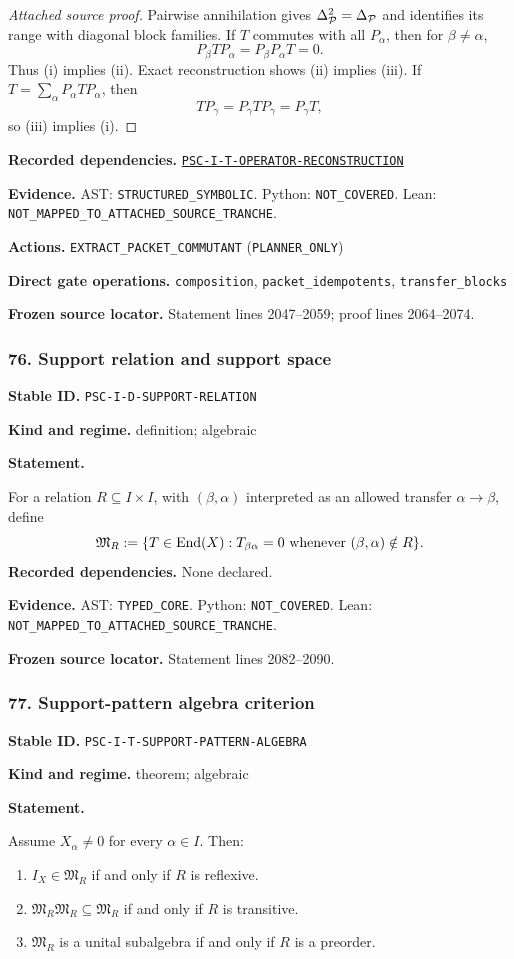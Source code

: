 \documentclass[a4paper,11pt]{article}
\newcommand{\field}[2]{\noindent\textbf{#1.} #2\par}
\begin{document}
\begin{proof}[Attached source proof]
Pairwise annihilation gives $\Delta_{\mathcal P}^2=\Delta_{\mathcal P}$ and identifies its range with diagonal block families.  If $T$ commutes with all $P_\alpha$, then for $\beta\neq\alpha$,
\[
P_\beta TP_\alpha=P_\beta P_\alpha T=0.
\]
Thus (i) implies (ii).  Exact reconstruction shows (ii) implies (iii).  If $T=\sum_\alpha P_\alpha TP_\alpha$, then
\[
TP_\gamma=P_\gamma TP_\gamma=P_\gamma T,
\]
so (iii) implies (i).
\end{proof}
\field{Recorded dependencies}{\hyperref[rec:PSC-I-T-OPERATOR-RECONSTRUCTION]{\nolinkurl{PSC-I-T-OPERATOR-RECONSTRUCTION}}}
\field{Evidence}{AST: \nolinkurl{STRUCTURED_SYMBOLIC}. Python: \nolinkurl{NOT_COVERED}. Lean: \nolinkurl{NOT_MAPPED_TO_ATTACHED_SOURCE_TRANCHE}.}
\field{Actions}{\nolinkurl{EXTRACT_PACKET_COMMUTANT} (\nolinkurl{PLANNER_ONLY})}
\field{Direct gate operations}{\nolinkurl{composition}, \nolinkurl{packet_idempotents}, \nolinkurl{transfer_blocks}}
\field{Frozen source locator}{Statement lines 2047--2059; proof lines 2064--2074.}
\subsubsection*{76. Support relation and support space}
\label{rec:PSC-I-D-SUPPORT-RELATION}
\field{Stable ID}{\nolinkurl{PSC-I-D-SUPPORT-RELATION}}
\field{Kind and regime}{definition; algebraic}
\textbf{Statement.}\par
For a relation $R\subseteq I\times I$, with $(\beta,\alpha)$ interpreted as an allowed transfer $\alpha\to\beta$, define
\[
\mathfrak M_R
:=
\{T\in\operatorname{End}(X):T_{\beta\alpha}=0\text{ whenever }(\beta,\alpha)\notin R\}.
\]
\field{Recorded dependencies}{None declared.}
\field{Evidence}{AST: \nolinkurl{TYPED_CORE}. Python: \nolinkurl{NOT_COVERED}. Lean: \nolinkurl{NOT_MAPPED_TO_ATTACHED_SOURCE_TRANCHE}.}
\field{Frozen source locator}{Statement lines 2082--2090.}
\subsubsection*{77. Support-pattern algebra criterion}
\label{rec:PSC-I-T-SUPPORT-PATTERN-ALGEBRA}
\field{Stable ID}{\nolinkurl{PSC-I-T-SUPPORT-PATTERN-ALGEBRA}}
\field{Kind and regime}{theorem; algebraic}
\textbf{Statement.}\par
Assume $X_\alpha\neq0$ for every $\alpha\in I$.  Then:
\begin{enumerate}[label=(\roman*)]
\item $I_X\in\mathfrak M_R$ if and only if $R$ is reflexive.
\item $\mathfrak M_R\mathfrak M_R\subseteq\mathfrak M_R$ if and only if $R$ is transitive.
\item $\mathfrak M_R$ is a unital subalgebra if and only if $R$ is a preorder.
\end{enumerate}
\end{document}
